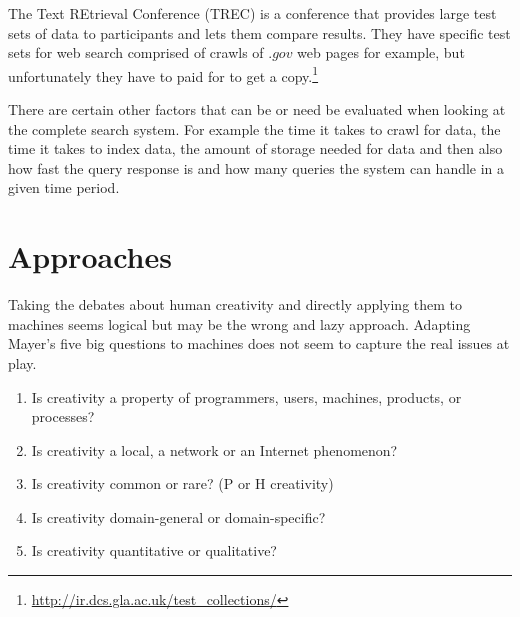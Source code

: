The Text REtrieval Conference (TREC) is a conference that provides large test sets of data to participants and lets them compare results. They have specific test sets for web search comprised of crawls of $.gov$ web pages for example, but unfortunately they have to paid for to get a copy.\footnote{\url{http://ir.dcs.gla.ac.uk/test_collections/}}%

There are certain other factors that can be or need be evaluated when looking at the complete search system. For example the time it takes to crawl for data, the time it takes to index data, the amount of storage needed for data and then also how fast the query response is and how many queries the system can handle in a given time period.


\section{Approaches}

Taking the debates about human creativity  and directly applying them to machines seems logical but may be the wrong and lazy approach. Adapting Mayer’s five big questions to machines does not seem to capture the real issues at play.

\begin{enumerate}
  \item Is creativity a property of programmers, users, machines, products, or processes?
  \item Is creativity a local, a network or an Internet phenomenon?
  \item Is creativity common or rare? (P or H creativity)
  \item Is creativity domain-general or domain-specific?
  \item Is creativity quantitative or qualitative?
\end{enumerate}

